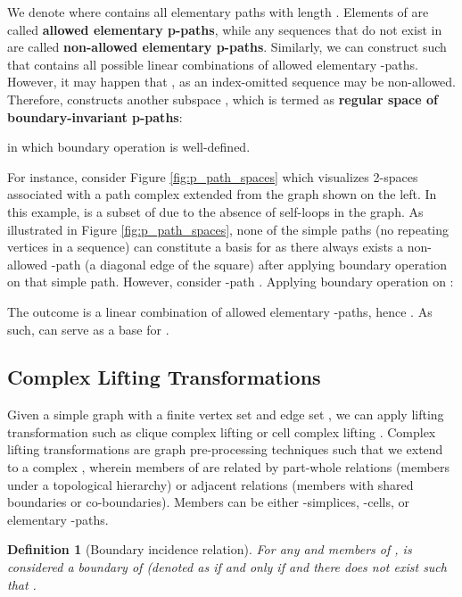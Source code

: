 \documentclass[letterpaper]{article} \usepackage{aaai24}  \usepackage{times}  \usepackage{helvet}  \usepackage{courier}  \usepackage[hyphens]{url}  \usepackage{graphicx} \urlstyle{rm} \def\UrlFont{\rm}  \usepackage{natbib}  \usepackage{caption} \frenchspacing  \setlength{\pdfpagewidth}{8.5in} \setlength{\pdfpageheight}{11in} \usepackage{algorithm}
\newtheorem{definition}{Definition}
\begin{document}
We denote  where  contains all elementary paths with length . Elements of  are called \textbf{allowed elementary p-paths}, while any sequences that do not exist in  are called \textbf{non-allowed elementary p-paths}. Similarly, we can construct  such that  contains all possible linear combinations of allowed elementary -paths. However, it may happen that , as an index-omitted sequence may be non-allowed. Therefore, \citeauthor{grigoryan_homologies_2013} constructs another subspace , which is termed as \textbf{regular space of  boundary-invariant p-paths}:

in which boundary operation is well-defined.

For instance, consider Figure \ref{fig:p_path_spaces} which visualizes 2-spaces associated with a path complex extended from the graph shown on the left. In this example,  is a subset of  due to the absence of self-loops in the graph. As illustrated in Figure \ref{fig:p_path_spaces}, none of the simple paths (no repeating vertices in a sequence) can constitute a basis for  as there always exists a non-allowed -path (a diagonal edge of the square) after applying boundary operation on that simple path. However, consider -path . Applying boundary operation on :

The outcome is a linear combination of allowed elementary -paths, hence . As such,  can serve as a base for .

\subsection{Complex Lifting Transformations} \label{subsec:complex-lifting}
Given a simple graph  with a finite vertex set  and edge set , we can apply lifting transformation such as clique complex lifting \cite{bodnar_weisfeiler_2021} or cell complex lifting \cite{bodnar_weisfeiler_2022}. Complex lifting transformations are graph pre-processing techniques such that we extend  to a complex , wherein members of  are related by part-whole relations \cite{papillon_architectures_2023} (members under a topological hierarchy) or adjacent relations (members with shared boundaries or co-boundaries). Members can be either -simplices, -cells, or elementary -paths.

\begin{definition}[Boundary incidence relation]{\cite{bodnar_weisfeiler_2021, bodnar_weisfeiler_2022}}
    For any  and  members of ,  is considered a boundary of  (denoted as  if and only if  and there does not exist  such that .
\end{definition}
\end{document}
